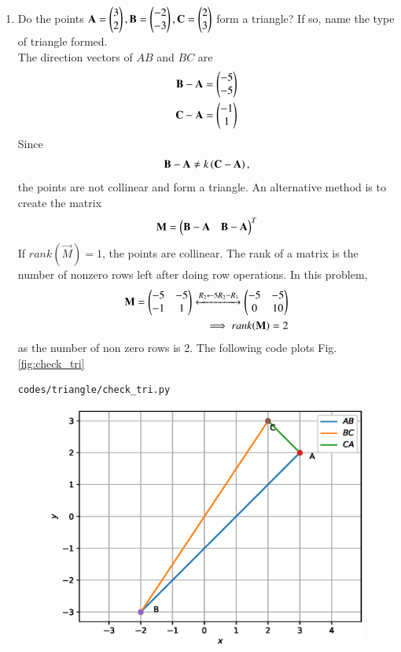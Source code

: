 \renewcommand{\theequation}{\theenumi}
\begin{enumerate}[label=\arabic*.,ref=\thesubsection.\theenumi]
%
\item Do the points $\mathbf{A}=\begin{pmatrix}3\\2\end{pmatrix}, \mathbf{B}=\begin{pmatrix}-2\\-3\end{pmatrix}, \mathbf{C}=\begin{pmatrix}2\\3\end{pmatrix} $ form a triangle?  If so, name the type of triangle formed.
\label{prob:tri_exam_coll_pts}
%
\\
\solution The direction vectors of $AB$ and $BC$ are 
\begin{align}
\label{eq:tri_geo_ex_baorth}
\mathbf{B}-\mathbf{A} &= \begin{pmatrix}-5\\-5\end{pmatrix}
\\
\mathbf{C}-\mathbf{A} &= \begin{pmatrix}-1\\1\end{pmatrix}
\label{eq:tri_geo_ex_caorth}
\end{align}
%
Since 
%
\begin{align}
\mathbf{B}-\mathbf{A} \ne k\left(\mathbf{C}-\mathbf{A}\right),
\end{align}
%
the points are not collinear and form a triangle.  An alternative method is to create the matrix
\begin{align}
\label{eq:tri_geo_ex_diff_mat}
\mathbf{M} = \begin{pmatrix}\mathbf{B}-\mathbf{A} & \mathbf{B}-\mathbf{A}\end{pmatrix}^T 
\end{align}
%
If $rank(\vec{M}) = 1$, the points are collinear.  The rank of a matrix is the number of nonzero rows left after doing row operations.  In this problem, 
%
\begin{align}
\mathbf{M} = \begin{pmatrix}-5 & -5\\-1 & 1\end{pmatrix}\xleftrightarrow {R_2\leftarrow 5R_2-R_1}\begin{pmatrix}-5 & -5\\0 & 10\end{pmatrix}
\\
\implies rank(\mathbf{M}) = 2
\end{align}
%
as the number of non zero rows is 2.
The following code plots Fig. \ref{fig:check_tri}
%
\begin{lstlisting}
codes/triangle/check_tri.py
\end{lstlisting}
%
\begin{figure}[!ht]
\includegraphics[width=\columnwidth]{./triangle/figs/check_tri.eps}

\end{figure}
\end{enumerate}
